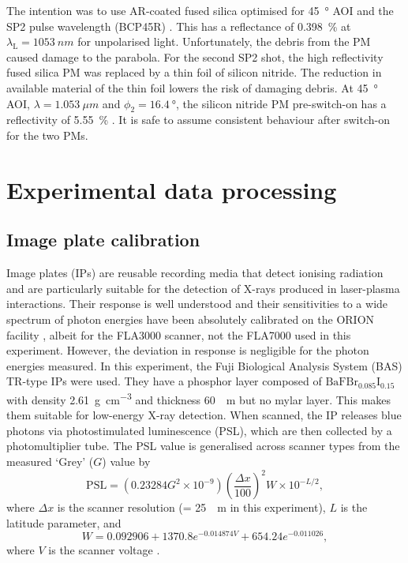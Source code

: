 The intention was to use \ac{AR}-coated fused silica optimised for \qty{45}{\degree} \ac{AOI} and the SP2 pulse wavelength (BCP45R) \cite{45AOIBeamsplitter}. This has a reflectance of \qty{0.398}{\%} at $\lambda_\mathrm{L} = \qty{1053}{nm}$ for unpolarised light. Unfortunately, the debris from the PM caused damage to the parabola. For the second SP2 shot, the high reflectivity fused silica PM was replaced by a thin foil of silicon nitride. The reduction in available material of the thin foil lowers the risk of damaging debris. At \qty{45}{\degree} \ac{AOI}, $\lambda = \qty{1.053}{\mu m}$ and $\phi_2 = \qty{16.4}{\degree}$, the silicon nitride PM pre-switch-on has a reflectivity of \qty{5.55}{\%} \cite{polyanskiyRefractiveindexInfoDatabase2024}. It is safe to assume consistent behaviour after switch-on for the two PMs.

\section{\label{ch:3-sec:data_processing}Experimental data processing}
\subsection{Image plate calibration}
Image plates (IPs) are reusable recording media that detect ionising radiation and are particularly suitable for the detection of X-rays produced in laser-plasma interactions. Their response is well understood and their sensitivities to a wide spectrum of photon energies have been absolutely calibrated on the ORION facility \cite{meadowcroftEvaluationSensitivityFading2008}, albeit for the FLA3000 scanner, not the FLA7000 used in this experiment. However, the deviation in response is negligible for the photon energies measured. In this experiment, the Fuji Biological Analysis System (BAS) TR-type IPs were used. They have a phosphor layer composed of $\mathrm{BaFBr_{0.085}I_{0.15}}$ with density \qty{2.61}{g.cm^{-3}} and thickness \qty{60}{\mu m} but no mylar layer. This makes them suitable for low-energy X-ray detection. When scanned, the IP releases blue photons via photostimulated luminescence (PSL), which are then collected by a photomultiplier tube. The PSL value is generalised across scanner types from the measured `Grey' ($G$) value by
\begin{equation}
	\mathrm{PSL} = (0.23284G^2\times 10^{-9})\left(\frac{\Delta x}{100}\right)^2W\times 10^{-L/2},
\end{equation}
where $\Delta x$ is the scanner resolution (= \qty{25}{\mu m} in this experiment), $L$ is the latitude parameter, and
\begin{equation}
	W = 0.092906 + 1370.8e^{-0.014874V} +  654.24e^{-0.011026},
\end{equation}
where $V$ is the scanner voltage \cite{golovinCalibrationImagingPlates2021}.

